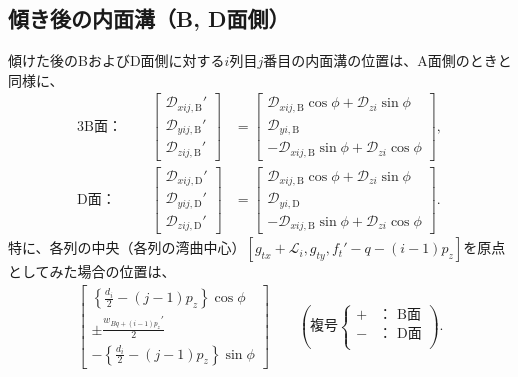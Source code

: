 \subsection{傾き後の内面溝（B, D面側）}
傾けた後のBおよびD面側に対する$i$列目$j$番目の内面溝の位置は、A面側のときと同様に、
\begin{alignat*}{3}
  \text{B面：}&~~&
  \left[
    \begin{array}{c}
      \mathcal D_{xij,\mathrm B}'\\
      \mathcal D_{yij,\mathrm B}'\\
      \mathcal D_{zij,\mathrm B}'
    \end{array}
  \right]
 &= \left[
    \begin{array}{c}
      \mathcal D_{xij,\mathrm B}\cos\phi+\mathcal D_{zi}\sin\phi\\
      \mathcal D_{yi,\mathrm B}\\
      -\mathcal D_{xij,\mathrm B}\sin\phi+\mathcal D_{zi}\cos\phi
    \end{array}
    \right],\\[2pt]
  \text{D面：}&~~&
  \left[
    \begin{array}{c}
      \mathcal D_{xij,\mathrm D}'\\
      \mathcal D_{yij,\mathrm D}'\\
      \mathcal D_{zij,\mathrm D}'
    \end{array}
  \right]
 &= \left[
    \begin{array}{c}
      \mathcal D_{xij,\mathrm B}\cos\phi+\mathcal D_{zi}\sin\phi\\
      \mathcal D_{yi,\mathrm D}\\
      -\mathcal D_{xij,\mathrm B}\sin\phi+\mathcal D_{zi}\cos\phi
    \end{array}
    \right].
\end{alignat*}
特に、各列の中央（各列の湾曲中心）$[g_{tx}+\mathcal L_i, g_{ty}, f_t'-q-(i-1)p_z]$を原点としてみた場合の位置は、
\begin{align*}
  \left[
  \begin{array}{c}
    \displaystyle \left\{\frac{d_i}2-(j-1)p_z\right\}\cos\phi\\
    \displaystyle \pm\frac{w_{Bq+(i-1)p_z}'}2\\
    \displaystyle -\left\{\frac{d_i}2-(j-1)p_z\right\}\sin\phi
  \end{array}
  \right]\qquad
  \left(
  \text{複号}
  \left\{
  \begin{array}{rl}
    \!+\!\!\!& \text{： B面}\\
    \!-\!\!\!& \text{： D面}\\
  \end{array}
  \right.
  \right).
\end{align*}



